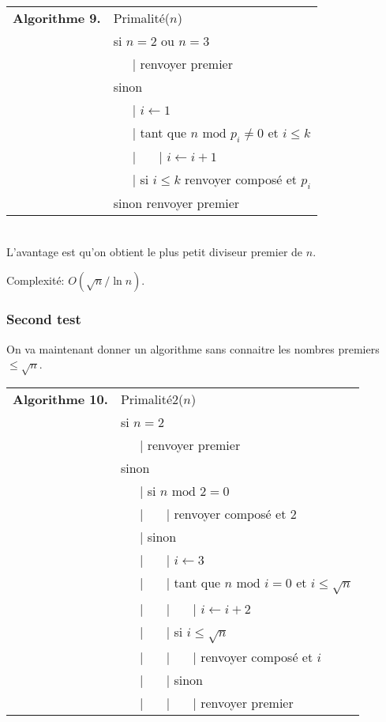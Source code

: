 \documentclass[10pt,a4paper]{report}
\begin{document}
\begin{tabular}{ll}
\textbf{Algorithme 9.} & Primalité($n$)\\
           & si $n=2$ ou $n=3$ \\
           & \ \ \ {\rm | } renvoyer premier  \\
           & sinon \\
           & \ \ \ {\rm |} $i \leftarrow 1$ \\
           & \ \ \ {\rm | } tant que $ n \text{ mod } p_i \neq 0 $ et $i \leqslant k$  \\
           & \ \ \ {\rm | } \ \ \ {\rm |} $ i \leftarrow i+1$\\ 
           & \ \ \ {\rm | } si $i \leqslant k$ renvoyer composé et $p_i$  \\    
           & sinon renvoyer premier 
\end{tabular}\\

L'avantage est qu'on obtient le plus petit diviseur premier de $n$.\par 
Complexité: $O (\sqrt{n}/ \ln n)$.

\subsubsection*{Second test}

On va maintenant donner un algorithme sans connaitre les nombres premiers $\leqslant \sqrt{n}$.   \\

\begin{tabular}{ll}
\textbf{Algorithme 10.} & Primalité2($n$)\\
           & si $n=2$ \\
           & \ \ \ {\rm | } renvoyer premier  \\
           & sinon \\
           & \ \ \ {\rm | } si $n \text{ mod }2  =0 $ \\
           & \ \ \ {\rm |} \ \ \ {\rm |} renvoyer composé et 2 \\
           & \ \ \ {\rm |} sinon  \\
           & \ \ \ {\rm |} \ \ \ {\rm |}   $i \leftarrow 3$ \\
           & \ \ \ {\rm |} \ \ \ {\rm |} tant que $ n \text{ mod }  i =0$ et $i \leqslant \sqrt{n}$  \\
           & \ \ \ {\rm |} \ \ \ {\rm |} \ \ \ {\rm |}  $ i \leftarrow i+2$\\
           & \ \ \ {\rm |} \ \ \ {\rm |} si $i \leqslant \sqrt{n} $ \\
           & \ \ \ {\rm |} \ \ \ {\rm |} \ \ \ {\rm |} renvoyer composé et $i$ \\
           & \ \ \ {\rm |} \ \ \ {\rm |} sinon  \\
           & \ \ \ {\rm |} \ \ \ {\rm |} \ \ \ {\rm |}   renvoyer premier  
\end{tabular}\\
\end{document}

